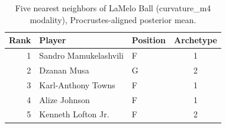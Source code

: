 \begin{table}[htbp]
  \centering\small
  \begin{tabular}{rllc}
    \toprule
    Rank & Player & Position & Archetype \\
    \midrule
    1 & Sandro Mamukelashvili & F & 1 \\
    2 & Dzanan Musa & G & 2 \\
    3 & Karl-Anthony Towns & F & 1 \\
    4 & Alize Johnson & F & 1 \\
    5 & Kenneth Lofton Jr. & F & 2 \\
    \bottomrule
  \end{tabular}
  \caption{Five nearest neighbors of LaMelo Ball (curvature_m4 modality), Procrustes-aligned posterior mean.}
  \label{tab:LaMelo_Ball_neighbors_curvature_m4}
\end{table}

